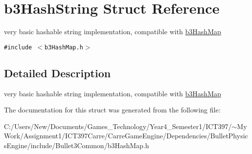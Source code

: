 \hypertarget{structb3_hash_string}{
\section{b3HashString Struct Reference}
\label{structb3_hash_string}
}
very basic hashable string implementation, compatible with \hyperlink{classb3_hash_map}{b3HashMap}  


{\tt \#include $<$b3HashMap.h$>$}



\subsection{Detailed Description}
very basic hashable string implementation, compatible with \hyperlink{classb3_hash_map}{b3HashMap} 

The documentation for this struct was generated from the following file:\begin{CompactItemize}
\item 
C:/Users/New/Documents/Games\_\-Technology/Year4\_\-Semester1/ICT397/$\sim$My Work/Assignment1/ICT397Carre/CarreGameEngine/Dependencies/BulletPhysicsEngine/include/Bullet3Common/b3HashMap.h\end{CompactItemize}
